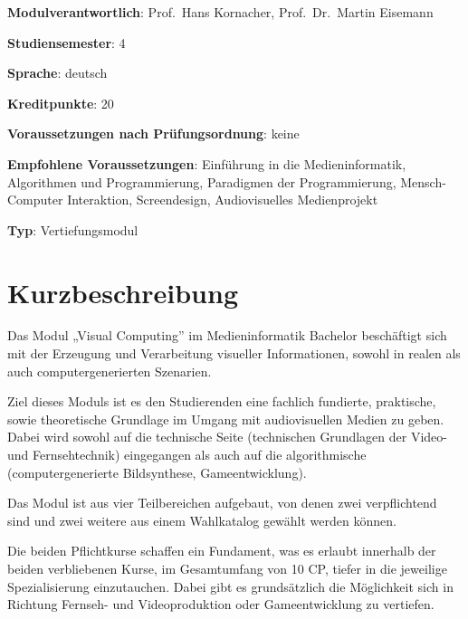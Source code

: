 \begin{modulHead}
\textbf{Modulverantwortlich}: Prof.~Hans Kornacher,
Prof.~Dr.~Martin
Eisemann
\end{modulHead}
\begin{modulHead}
\textbf{Studiensemester}:
4
\end{modulHead}
\begin{modulHead}
\textbf{Sprache}:
deutsch
\end{modulHead}
\begin{modulHead}
\textbf{Kreditpunkte}:
20
\end{modulHead}
\begin{modulHead}
\textbf{Voraussetzungen nach
Prüfungsordnung}:
keine
\end{modulHead}
\begin{modulHead}
\textbf{Empfohlene
Voraussetzungen}: Einführung in die Medieninformatik, Algorithmen und
Programmierung, Paradigmen der Programmierung, Mensch-Computer
Interaktion, Screendesign, Audiovisuelles
Medienprojekt
\end{modulHead}
\begin{modulHead}
\textbf{Typ}:
Vertiefungsmodul
\end{modulHead}


\section*{Kurzbeschreibung\label{/mi-2017/modulbeschreibungen-bachelor/BA_Vertiefung-Visual-Computing}}\label{kurzbeschreibungpathlabelmi-2017modulbeschreibungen-bachelorbaux5fvertiefung-visual-computing}

Das Modul „Visual Computing'' im Medieninformatik Bachelor beschäftigt
sich mit der Erzeugung und Verarbeitung visueller Informationen, sowohl
in realen als auch computergenerierten Szenarien.

Ziel dieses Moduls ist es den Studierenden eine fachlich fundierte,
praktische, sowie theoretische Grundlage im Umgang mit audiovisuellen
Medien zu geben. Dabei wird sowohl auf die technische Seite (technischen
Grundlagen der Video- und Fernsehtechnik) eingegangen als auch auf die
algorithmische (computergenerierte Bildsynthese, Gameentwicklung).

Das Modul ist aus vier Teilbereichen aufgebaut, von denen zwei
verpflichtend sind und zwei weitere aus einem Wahlkatalog gewählt werden
können.

Die beiden Pflichtkurse schaffen ein Fundament, was es erlaubt innerhalb
der beiden verbliebenen Kurse, im Gesamtumfang von 10 CP, tiefer in die
jeweilige Spezialisierung einzutauchen. Dabei gibt es grundsätzlich die
Möglichkeit sich in Richtung Fernseh- und Videoproduktion oder
Gameentwicklung zu vertiefen.

